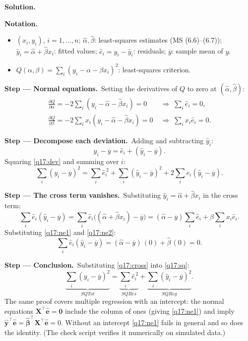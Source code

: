 \documentclass[11pt,a4paper]{article}
\numberwithin{equation}{questao}   %
\newenvironment{notacao}{\par\smallskip\noindent\textbf{Notation.}\begin{itemize}[leftmargin=1.4em,topsep=1pt,itemsep=0pt]\small}{\end{itemize}}
\newcommand{\passo}[2]{\par\smallskip\noindent\textbf{Step --- #1.}~#2}
\newcommand{\solhead}{\par\medskip\noindent{\color{blue!55!black}\rule{\linewidth}{0.3pt}}\par\noindent\textbf{Solution.}}
\begin{document}
\begin{sol}
\solhead
\begin{notacao}
\item $(x_i,y_i)$, $i=1,\dots,n$; $\widehat\alpha,\widehat\beta$: least-squares estimates (MS (6.6)--(6.7));
  $\widehat y_i=\widehat\alpha+\widehat\beta x_i$: fitted values; $\widehat e_i=y_i-\widehat y_i$: residuals;
  $\overline y$: sample mean of $y$.
\item $Q(\alpha,\beta)=\sum_i(y_i-\alpha-\beta x_i)^2$: least-squares criterion.
\end{notacao}

\passo{Normal equations}{Setting the derivatives of $Q$ to zero at $(\widehat\alpha,\widehat\beta)$:}
\begin{align}
\frac{\partial Q}{\partial\alpha}=-2\sum_i(y_i-\widehat\alpha-\widehat\beta x_i)=0&\;\Longrightarrow\;\sum_i\widehat e_i=0, \label{q17:ne1}\\
\frac{\partial Q}{\partial\beta}=-2\sum_ix_i(y_i-\widehat\alpha-\widehat\beta x_i)=0&\;\Longrightarrow\;\sum_ix_i\widehat e_i=0. \label{q17:ne2}
\end{align}

\passo{Decompose each deviation}{Adding and subtracting $\widehat y_i$:}
\begin{equation}\label{q17:dev}
y_i-\overline y=\widehat e_i+(\widehat y_i-\overline y).
\end{equation}
Squaring \eqref{q17:dev} and summing over $i$:
\begin{equation}\label{q17:sq}
\sum_i(y_i-\overline y)^2=\sum_i\widehat e_i^{\,2}+\sum_i(\widehat y_i-\overline y)^2+2\sum_i\widehat e_i(\widehat y_i-\overline y).
\end{equation}

\passo{The cross term vanishes}{Substituting $\widehat y_i=\widehat\alpha+\widehat\beta x_i$ in the cross term:}
\[
\sum_i\widehat e_i(\widehat y_i-\overline y)=\sum_i\widehat e_i\big((\widehat\alpha+\widehat\beta x_i)-\overline y\big)
=(\widehat\alpha-\overline y)\sum_i\widehat e_i+\widehat\beta\sum_ix_i\widehat e_i .
\]
Substituting \eqref{q17:ne1} and \eqref{q17:ne2}:
\begin{equation}\label{q17:cross}
\sum_i\widehat e_i(\widehat y_i-\overline y)=(\widehat\alpha-\overline y)\,(0)+\widehat\beta\,(0)=0 .
\end{equation}

\passo{Conclusion}{Substituting \eqref{q17:cross} into \eqref{q17:sq}:}
\[
\underbrace{\sum_i(y_i-\overline y)^2}_{SQTot}=\underbrace{\sum_i\widehat e_i^{\,2}}_{SQRes}+\underbrace{\sum_i(\widehat y_i-\overline y)^2}_{SQReg}.
\]
The same proof covers multiple regression with an intercept: the normal equations
$\mathbf X^\top\widehat{\mathbf e}=\mathbf 0$ include the column of ones (giving \eqref{q17:ne1}) and
imply $\widehat{\mathbf y}^\top\widehat{\mathbf e}=\widehat{\boldsymbol\beta}^\top\mathbf X^\top\widehat{\mathbf e}=0$.
Without an intercept \eqref{q17:ne1} fails in general and so does the identity. (The check script
verifies it numerically on simulated data.)


\end{sol}
\end{document}
